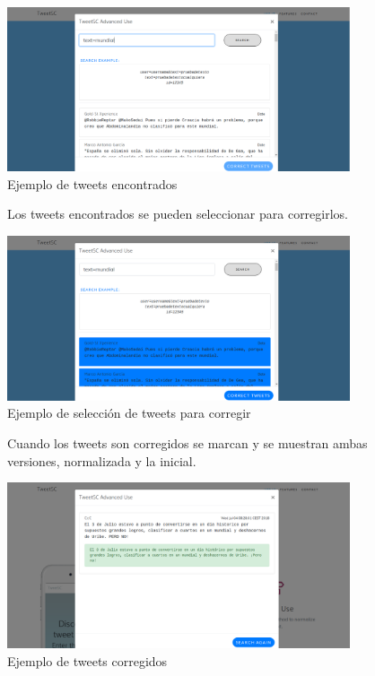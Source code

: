 \documentclass[spanish,12pt, a4paper,twoside]{paper}
\begin{document}
\begin{figure}[h]
\centering
 \includegraphics[width=0.9\textwidth]{recursos/WebUseIt_AdvancedUse_SearchResult.png}
\caption{Ejemplo de tweets encontrados}
\label{fig:webuseitadvancedusesearchresult}
\end{figure}

\begin{figure}[h]
Los tweets encontrados se pueden seleccionar para corregirlos.
\begin{center}
 \includegraphics[width=0.9\textwidth]{recursos/WebUseIt_AdvancedUse_TweetsSelected.png}
\caption{Ejemplo de selección de tweets para corregir}
\label{fig:webuseitadvancedusetweetselected}
\end{center}
\end{figure}

\begin{figure}[h]
Cuando los tweets son corregidos se marcan y se muestran ambas versiones, normalizada y la inicial.
\begin{center}
 \includegraphics[width=0.9\textwidth]{recursos/WebUseIt_AdvancedUse_TweetCorrected.png}
\caption{Ejemplo de tweets corregidos}
\label{fig:webuseitadvancedusetweetcorrected}
\end{center}
\end{figure}
\end{document}

